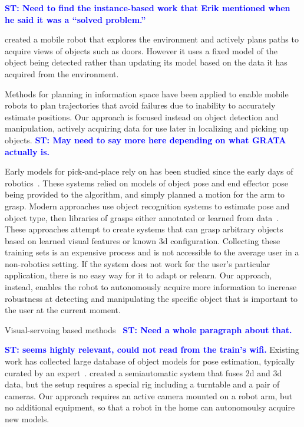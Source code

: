 \documentclass[conference]{IEEEtran}
\newcommand{\stnote}[1]{\textcolor{blue}{\textbf{ST: #1}}}
\begin{document}
\stnote{Need to find the instance-based work that Erik mentioned when
  he said it was a ``solved problem.''}

\citet{velez11} created a mobile robot that explores the environment
and actively plans paths to acquire views of objects such as doors.
However it uses a fixed model of the object being detected rather than
updating its model based on the data it has acquired from the
environment.

Methods for planning in information space \citep{he08, atanasov13,
  prentice09} have been applied to enable mobile robots to plan
trajectories that avoid failures due to inability to accurately
estimate positions.  Our approach is focused instead on
object detection and manipulation, actively acquiring data for use
later in localizing and picking up objects. \stnote{May need to say
  more here depending on what GRATA actually is.}


Early models for pick-and-place rely on has been studied since the
early days of robotics~\citep{brooks83, lozano89}.  These systems
relied on models of object pose and end effector pose being provided to the
algorithm, and simply planned a motion for the arm to grasp.  Modern
approaches use object recognition systems to estimate pose and object
type, then libraries of grasps either annotated or learned from
data~\citep{saxena08, goldfeder09, morales03}.  These approaches
attempt to create systems that can grasp arbitrary objects based on
learned visual features or known 3d configuration.  Collecting these
training sets is an expensive process and is not accessible to the
average user in a non-robotics setting.  If the system does not work
for the user's particular application, there is no easy way for it to
adapt or relearn.  Our approach, instead, enables the robot to
autonomously acquire more information to increase robustness at
detecting and manipulating the specific object that is important to
the user at the current moment.

Visual-servoing based methods~\citep{chaumette06} \stnote{Need a whole
  paragraph about that. }

\stnote{\citet{ciocarlie14} seems highly relevant, could not read from
  the train's wifi.}  Existing work has collected large database of
object models for pose estimation, typically curated by an
expert~\citep{lai11}.  \citet{kasper12} created a semiautomatic system
that fuses 2d and 3d data, but the setup requires a special rig
including a turntable and a pair of cameras.  Our approach requires an
active camera mounted on a robot arm, but no additional equipment, so
that a robot in the home can autonomoulsy acquire new models.
\end{document}
